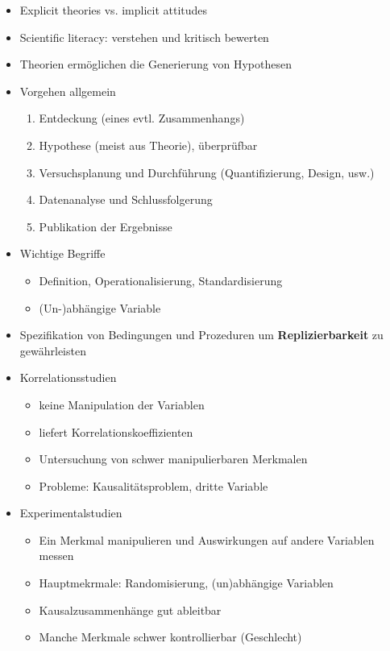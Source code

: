 \documentclass[11pt, paper=a4, twocolumn]{scrartcl}
\begin{document}
	\begin{itemize}
		\item Explicit theories vs. implicit attitudes
		\item Scientific literacy: verstehen und kritisch bewerten
		\item Theorien ermöglichen die Generierung von Hypothesen
		\item Vorgehen allgemein
			\begin{enumerate}
				\item Entdeckung (eines evtl. Zusammenhangs)
				\item Hypothese (meist aus Theorie), überprüfbar
				\item Versuchsplanung und Durchführung (Quantifizierung, Design, usw.)
				\item Datenanalyse und Schlussfolgerung
				\item Publikation der Ergebnisse
			\end{enumerate}
		\item Wichtige Begriffe
			\begin{itemize}
				\item Definition, Operationalisierung, Standardisierung
				\item (Un-)abhängige Variable
			\end{itemize}
		\item Spezifikation von Bedingungen und Prozeduren um 
			\textbf{Replizierbarkeit} zu gewährleisten
		\item Korrelationsstudien
			\begin{itemize}
				\item keine Manipulation der Variablen
				\item liefert Korrelationskoeffizienten
				\item Untersuchung von schwer manipulierbaren Merkmalen
				\item Probleme: Kausalitätsproblem, dritte Variable
			\end{itemize}
		\item Experimentalstudien
			\begin{itemize}
				\item Ein Merkmal manipulieren und Auswirkungen auf 
					andere Variablen messen
				\item Hauptmekrmale: Randomisierung, (un)abhängige 
					Variablen
				\item Kausalzusammenhänge gut ableitbar
				\item Manche Merkmale schwer kontrollierbar (Geschlecht)
			\end{itemize}

\end{itemize}
\end{document}
